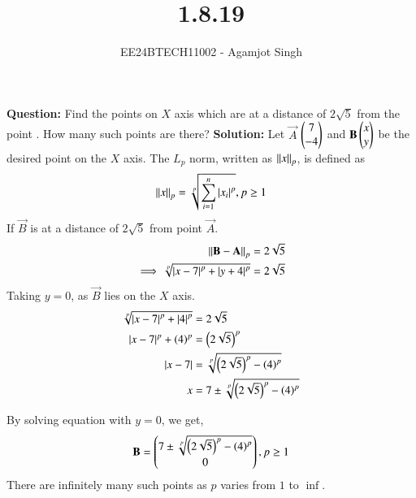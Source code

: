 \documentclass[journal]{IEEEtran}
\begin{document}

\vspace{3cm}

\title{1.8.19}
\author{EE24BTECH11002 - Agamjot Singh}
{\let\newpage\relax\maketitle}
\renewcommand{\thefigure}{\theenumi}
\renewcommand{\thetable}{\theenumi}
\setlength{\intextsep}{10pt} %

\textbf{Question:}
\newline
Find the points on $X$ axis which are at a distance of $2\sqrt{5}$ from the point . How many such points are there?
\newline
\textbf{Solution:}
\newline
Let $\vec{A}$ $\begin{pmatrix}7\\-4\end{pmatrix}$ and $\mathbf{B} \begin{pmatrix}x\\y\end{pmatrix}$ be the desired point on the $X$ axis.
\newline
The $L_p$ norm, written as $\left\lVert x\right\rVert_p$, is defined as
\begin{align}
	\left\lVert x\right\rVert_p = \sqrt[p]{\sum_{i=1}^{n}\left\vert x_i\right\vert^p}, p\geq 1
\end{align}
If $\vec{B}$ is at a distance of $2\sqrt{5}$ from point $\vec{A}$.
\begin{align}
	\left\lVert\mathbf{B} - \mathbf{A}\right\rVert_p &= 2\sqrt{5}\\
	\implies \sqrt[p]{\left\vert x - 7\right\vert^p + \left\vert y + 4\right\vert^p} &= 2\sqrt{5}\\
\end{align}
Taking $y = 0$, as $\vec{B}$ lies on the $X$ axis.
\begin{align}
	\sqrt[p]{\left\vert x - 7\right\vert^p + \left\vert4\right\vert^p} &= 2\sqrt{5}\\
	\left\vert x - 7\right\vert^p + \left(4\right)^p &= \left(2\sqrt{5}\right)^p\\
	\left\vert x - 7\right\vert &= \sqrt[p]{\left(2\sqrt{5}\right)^p - \left(4\right)^p}\\
	x &= 7 \pm \sqrt[p]{\left(2\sqrt{5}\right)^p - \left(4\right)^p}
\end{align}

By solving equation  with $y = 0$, we get,
\begin{align}
	\mathbf{B} = \begin{pmatrix}7 \pm \sqrt[p]{\left(2\sqrt{5}\right)^p - \left(4\right)^p}\\0\end{pmatrix}, p \geq 1 
\end{align} 
There are infinitely many such points as $p$ varies from $1$ to $\inf$.
\end{document}
